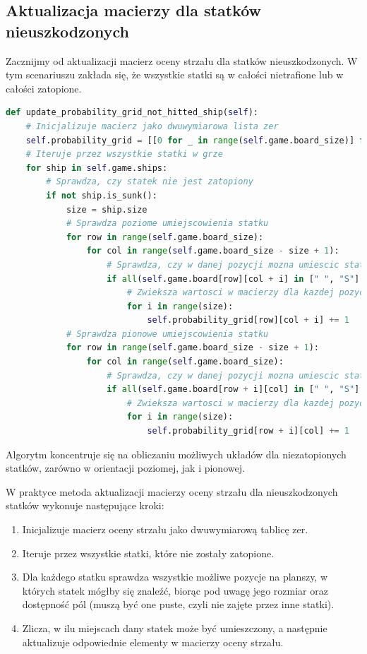 \documentclass[magisterska]{pracadypl}
\begin{document}
\subsection{Aktualizacja macierzy dla statków nieuszkodzonych}
Zacznijmy od aktualizacji macierz oceny strzału dla statków nieuszkodzonych. W tym scenariuszu zakłada się, że wszystkie statki są w całości nietrafione lub w całości zatopione. 
\begin{lstlisting}[language=Python, caption=Kod metody update\_probability\_grid\_not\_hitted\_ship  klasy ProbabilityStrategy ] 
def update_probability_grid_not_hitted_ship(self):
    # Inicjalizuje macierz jako dwuwymiarowa lista zer
    self.probability_grid = [[0 for _ in range(self.game.board_size)] for _ in range(self.game.board_size)]
    # Iteruje przez wszystkie statki w grze
    for ship in self.game.ships:
        # Sprawdza, czy statek nie jest zatopiony
        if not ship.is_sunk():
            size = ship.size
            # Sprawdza poziome umiejscowienia statku
            for row in range(self.game.board_size):
                for col in range(self.game.board_size - size + 1):
                    # Sprawdza, czy w danej pozycji mozna umiescic statek
                    if all(self.game.board[row][col + i] in [" ", "S"] for i in range(size)):
                        # Zwieksza wartosci w macierzy dla kazdej pozycji statku
                        for i in range(size):
                            self.probability_grid[row][col + i] += 1
            # Sprawdza pionowe umiejscowienia statku
            for row in range(self.game.board_size - size + 1):
                for col in range(self.game.board_size):
                    # Sprawdza, czy w danej pozycji mozna umiescic statek
                    if all(self.game.board[row + i][col] in [" ", "S"] for i in range(size)):
                        # Zwieksza wartosci w macierzy dla kazdej pozycji statku
                        for i in range(size):
                            self.probability_grid[row + i][col] += 1

\end{lstlisting}

Algorytm koncentruje się na obliczaniu możliwych układów dla niezatopionych statków, zarówno w orientacji poziomej, jak i pionowej.

W praktyce metoda aktualizacji macierzy oceny strzału dla nieuszkodzonych statków wykonuje następujące kroki:
\begin{enumerate}
    \item Inicjalizuje macierz oceny strzału jako dwuwymiarową tablicę zer.
    \item Iteruje przez wszystkie statki, które nie zostały zatopione.
    \item Dla każdego statku sprawdza wszystkie możliwe pozycje na planszy, w których statek mógłby się znaleźć, biorąc pod uwagę jego rozmiar oraz dostępność pól (muszą być one puste, czyli nie zajęte przez inne statki).
    \item Zlicza, w ilu miejscach dany statek może być umieszczony, a następnie aktualizuje odpowiednie elementy w macierzy oceny strzału.
\end{enumerate}
\end{document}
